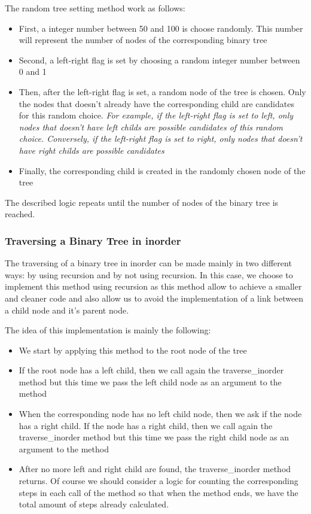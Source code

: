 \documentclass[12p]{report}
\begin{document}
The random tree setting method work as follows: 
\begin{itemize}
  \item First, a  integer number between 50 and 100 is choose randomly. This number will represent the number of nodes of the corresponding binary tree
  \item Second, a left-right flag is set by choosing a random integer number between 0 and 1
  \item Then, after the left-right flag is set, a random node of the tree is chosen. Only the nodes that doesn't already have the corresponding child are candidates for this random choice. \textit{For example, if the left-right flag is set to left, only nodes that doesn't have left childs are possible candidates of this random choice. Conversely, if the left-right flag is set to right, only nodes that doesn't have right childs are possible candidates}
  \item Finally, the corresponding child is created in the randomly chosen node of the tree
\end{itemize}

The described logic repeats until the number of nodes of the binary tree is reached.

  \subsubsection{Traversing a Binary Tree in inorder}
The traversing of a binary tree in inorder can be made mainly in two different ways: by using recursion and by not using recursion. In this case, we choose to implement this method using recursion as this method allow to achieve a smaller and cleaner code and also allow us to avoid the implementation of a link between a child node and it's parent node.

\bigskip

The idea of this implementation is mainly the following:
\begin{itemize}
  \item We start by applying this method to the root node of the tree
  \item If the root node has a left child, then we call again the traverse\_inorder method but this time we pass the left child node as an argument to the method
  \item When the corresponding node has no left child node, then we ask if the node has a right child. If the node has a right child, then we call again the traverse\_inorder method but this time we pass the right child node as an argument to the method
  \item After no more left and right child are found, the traverse\_inorder method returns. Of course we should consider a logic for counting the corresponding steps in each call of the method so that when the method ends, we have the total amount of steps already calculated.
\end{itemize}
\end{document}
